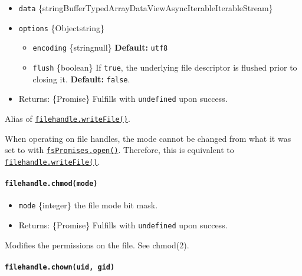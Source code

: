 \begin{itemize}
\tightlist
\item
  \texttt{data}
  \{string\textbar Buffer\textbar TypedArray\textbar DataView\textbar AsyncIterable\textbar Iterable\textbar Stream\}
\item
  \texttt{options} \{Object\textbar string\}

  \begin{itemize}
  \tightlist
  \item
    \texttt{encoding} \{string\textbar null\} \textbf{Default:}
    \texttt{\textquotesingle{}utf8\textquotesingle{}}
  \item
    \texttt{flush} \{boolean\} If \texttt{true}, the underlying file
    descriptor is flushed prior to closing it. \textbf{Default:}
    \texttt{false}.
  \end{itemize}
\item
  Returns: \{Promise\} Fulfills with \texttt{undefined} upon success.
\end{itemize}

Alias of
\hyperref[filehandlewritefiledata-options]{\texttt{filehandle.writeFile()}}.

When operating on file handles, the mode cannot be changed from what it
was set to with
\hyperref[fspromisesopenpath-flags-mode]{\texttt{fsPromises.open()}}.
Therefore, this is equivalent to
\hyperref[filehandlewritefiledata-options]{\texttt{filehandle.writeFile()}}.

\paragraph{\texorpdfstring{\texttt{filehandle.chmod(mode)}}{filehandle.chmod(mode)}}\label{filehandle.chmodmode}

\begin{itemize}
\tightlist
\item
  \texttt{mode} \{integer\} the file mode bit mask.
\item
  Returns: \{Promise\} Fulfills with \texttt{undefined} upon success.
\end{itemize}

Modifies the permissions on the file. See chmod(2).

\paragraph{\texorpdfstring{\texttt{filehandle.chown(uid,\ gid)}}{filehandle.chown(uid, gid)}}\label{filehandle.chownuid-gid}

